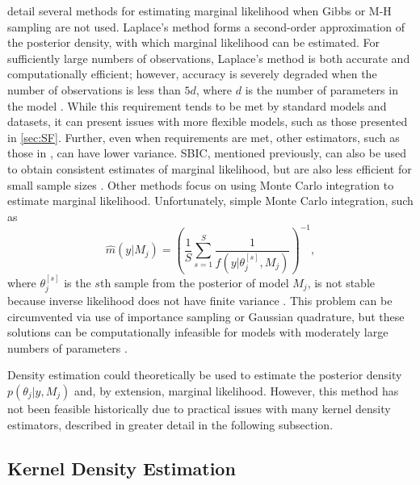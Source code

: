 \documentclass[twocolumn]{article}
\begin{document}
\cite{KassRaftery} detail several methods for estimating marginal likelihood when Gibbs or M-H sampling are not used. Laplace's method forms a second-order approximation of the posterior density, with which marginal likelihood can be estimated. For sufficiently large numbers of observations, Laplace's method is both accurate and computationally efficient; however, accuracy is severely degraded when the number of observations is less than $5d$, where $d$ is the number of parameters in the model \citep{Slate}. While this requirement tends to be met by standard models and datasets, it can present issues with more flexible models, such as those presented in \cref{sec:SF}. Further, even when requirements are met, other estimators, such as those in \cite{Chib}, can have lower variance. SBIC, mentioned previously, can also be used to obtain consistent estimates of marginal likelihood, but are also less efficient for small sample sizes \cite{Bollen}. Other methods focus on using Monte Carlo integration to estimate marginal likelihood. Unfortunately, simple Monte Carlo integration, such as
\begin{equation}
	\hat{m}(y|M_j) = \left(\frac{1}{S} \sum_{s=1}^S \frac{1}{f(y|\theta_j^{[s]}, M_j)}\right)^{-1},
\end{equation}
where $\theta_j^{[s]}$ is the $s$th sample from the posterior of model $M_j$, is not stable because inverse likelihood does not have finite variance \citep{NewtonRaferty}. This problem can be circumvented via use of importance sampling or Gaussian quadrature, but these solutions can be computationally infeasible for models with moderately large numbers of parameters \citep{GenzKass}.

Density estimation could theoretically be used to estimate the posterior density $p(\theta_j|y, M_j)$ and, by extension, marginal likelihood. However, this method has not been feasible historically due to practical issues with many kernel density estimators, described in greater detail in the following subsection.

\subsection{Kernel Density Estimation}

\end{document}
